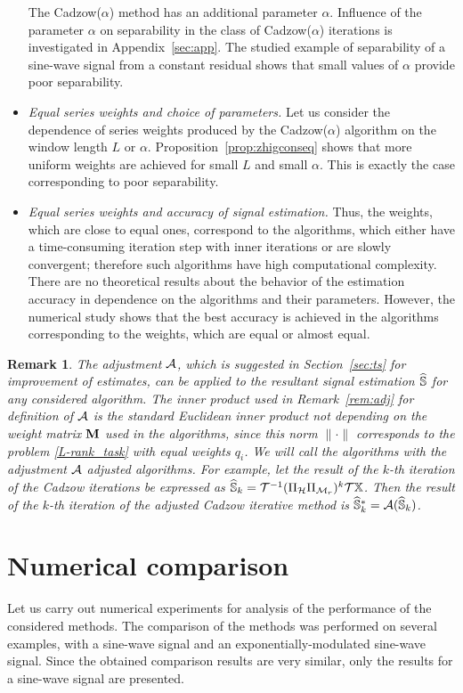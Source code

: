 \documentclass[sii]{ipart}
\newtheorem{remark}{Remark}
\begin{document}
\begin{itemize}
The Cadzow($\alpha$) method has an additional parameter $\alpha$.
Influence of the parameter $\alpha$ on separability in the class of Cadzow($\alpha$) iterations is investigated in Appendix~\ref{sec:app}.
 The studied example of separability of a sine-wave signal from a constant residual shows that small values of $\alpha$ provide poor separability.
        \item \textit{Equal series weights and choice of parameters.}
        Let us consider the dependence of series weights produced by the Cadzow($\alpha$) algorithm on the window length $L$ or $\alpha$. Proposition~\ref{prop:zhigconseq} shows that more uniform weights are achieved for small $L$ and small $\alpha$. This is exactly
        the case corresponding to poor separability.
 		\item \textit{Equal series weights and accuracy of signal estimation.}
 Thus, the weights, which are close to equal ones, correspond to the algorithms, which either have a time-consuming iteration step with inner iterations or are slowly convergent; therefore such algorithms have high computational complexity.
There are no theoretical results about the behavior of the estimation accuracy in dependence on the algorithms and their parameters. However, the numerical study shows that the best accuracy is achieved in the algorithms corresponding to the weights, which are equal or almost equal.	 
\end{itemize}
	
	\begin{remark}
		\label{rem:adjust}
		The adjustment $\mathcal{A}$, which is suggested in Section~\ref{sec:ts} for improvement of estimates, can be applied to the resultant signal estimation $\widehat{\mathbb{S}}$ for any considered algorithm. The inner product used in Remark~\ref{rem:adj} for definition of $\mathcal{A}$ is the standard Euclidean inner product not depending on the weight matrix $\mathbf{M}$ used in the algorithms, since this norm $\|\cdot\|$ corresponds to the problem \eqref{L-rank_task} with equal weights $q_i$. We will call the algorithms with the adjustment $\mathcal{A}$ \emph{adjusted algorithms}. For example, let the result of the $k$-th iteration of the Cadzow iterations be expressed as $\widehat{\mathbb{S}}_k = \mathcal{T}^{-1}(\Pi_{\mathcal{H}} \Pi_{\mathcal{M}_r})^k \mathcal{T} \mathbb{X}$. Then the result of the $k$-th iteration of the adjusted Cadzow iterative method is $\widehat{\mathbb{S}}_k^*=\mathcal{A}(\widehat{\mathbb{S}}_k)$.
	\end{remark}

\section{Numerical comparison}
\label{sec:simul}
Let us carry out numerical experiments for analysis of the performance of the considered methods. The comparison of the methods was performed on several examples, with a sine-wave signal and an exponentially-modulated sine-wave signal.
Since the obtained comparison results are very similar, only the results for a sine-wave signal are presented.
\end{document}
